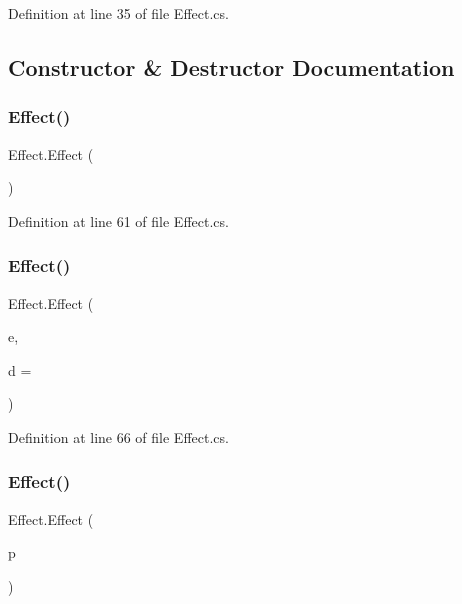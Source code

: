 Definition at line 35 of file Effect.\+cs.



\subsection{Constructor \& Destructor Documentation}
\mbox{\label{class_effect_a426033488b51897723a6aa15d1e66415}} 
\subsubsection{\texorpdfstring{Effect()}{Effect()}\hspace{0.1cm}{\footnotesize\ttfamily [1/3]}}
{\footnotesize\ttfamily Effect.\+Effect (\begin{DoxyParamCaption}{ }\end{DoxyParamCaption})}



Definition at line 61 of file Effect.\+cs.

\mbox{\label{class_effect_af2775716fce582c0a621f6c68ddb8574}} 
\subsubsection{\texorpdfstring{Effect()}{Effect()}\hspace{0.1cm}{\footnotesize\ttfamily [2/3]}}
{\footnotesize\ttfamily Effect.\+Effect (\begin{DoxyParamCaption}\item[{\mbox{\hyperlink{class_effect_a28d85888db94ec53ee9cb75e9706f6e4}{Effect\+Type}}}]{e,  }\item[{int}]{d = {} }\end{DoxyParamCaption})}



Definition at line 66 of file Effect.\+cs.

\mbox{\label{class_effect_afc3ee0f70107f501148217c076092f40}} 
\subsubsection{\texorpdfstring{Effect()}{Effect()}\hspace{0.1cm}{\footnotesize\ttfamily [3/3]}}
{\footnotesize\ttfamily Effect.\+Effect (\begin{DoxyParamCaption}\item[{\mbox{\hyperlink{class_effect_a84f32661374cee093139535ae75c58ad}{Preset}}}]{p }\end{DoxyParamCaption})}



